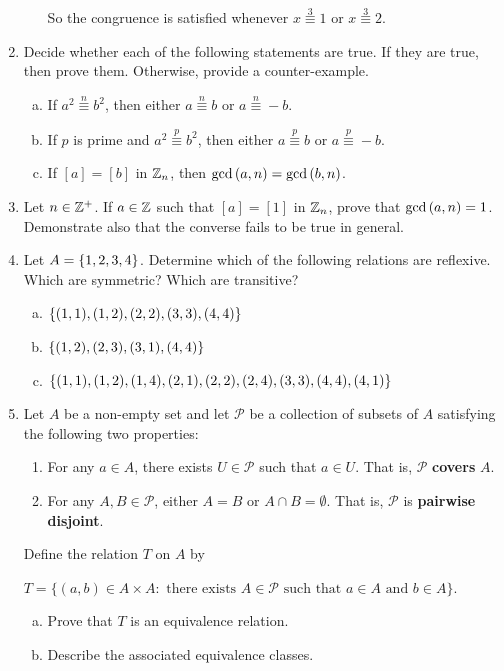\documentclass[11pt,fleqn,dvipsnames,usenames]{article}
\begin{document}
\begin{enumerate}
\begin{enumerate}[(a)]
So the congruence is satisfied whenever $x\overset{3}{\equiv}1$ or $x\overset{3}{\equiv}2$.
\end{enumerate}
\item Decide whether each of the following statements are true.  If they are true, then prove them.  Otherwise, provide a counter-example.
\begin{enumerate}[(a)]
\item If $a^2\overset{n}{\equiv}b^2$, then either $a\overset{n}{\equiv}b$ or $a\overset{n}{\equiv}-b$.
\item If $p$ is prime and $a^2\overset{p}{\equiv}b^2$, then either $a\overset{p}{\equiv}b$ or $a\overset{p}{\equiv}-b$.
\item If $[a] = [b]$ in $\mathbb{Z}_{n}$, then $\text{gcd}\left(a,n\right) = \text{gcd}\left(b,n\right)$.
\end{enumerate}
\item Let $n\in\mathbb{Z}^{+}$.  If $a\in \mathbb{Z}$ such that $[a] = [1]$ in $\mathbb{Z}_{n}$, prove that $\text{gcd}\left(a,n\right) = 1$.  Demonstrate also that the converse fails to be true in general.
\item Let $A = \left\{1,2,3,4\right\}$.  Determine which of the following relations are reflexive.  Which are symmetric?  Which are transitive?
\begin{enumerate}[(a)]
\item $\left\{(1,1), (1,2), (2,2), (3,3), (4,4)\right\}$
\item $\left\{(1,2), (2,3), (3,1), (4,4)\right\}$
\item $\left\{(1,1), (1,2), (1,4), (2,1), (2,2), (2,4), (3,3), (4,4), (4,1)\right\}$
\end{enumerate}
\item Let $A$ be a non-empty set and let $\mathcal{P}$ be a collection of subsets of $A$ satisfying the following two properties:
\begin{enumerate}[(1)]
\item For any $a\in A$, there exists $U\in\mathcal{P}$ such that $a\in U$.  That is, $\mathcal{P}$ \textbf{covers} $A$.
\item For any $A,B\in\mathcal{P}$, either $A = B$ or $A\cap B = \emptyset$.  That is, $\mathcal{P}$ is \textbf{pairwise disjoint}.
\end{enumerate}
Define the relation $T$ on $A$ by
\begin{center}
$T = \big\{(a,b)\in A\times A:\text{ there exists }A\in\mathcal{P}\text{ such that }a\in A\text{ and }b\in A\big\}$.
\end{center}
\begin{enumerate}[(a)]
\item Prove that $T$ is an equivalence relation.
\item Describe the associated equivalence classes.
\end{enumerate}
\end{enumerate}
\end{document}
